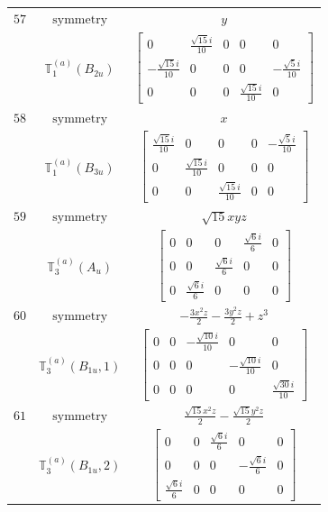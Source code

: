 \documentclass[fleqn,8pt,landscape]{jsarticle}
\begin{document}
\begin{longtable}{ccc}
$ 57 $ & $ \text{symmetry} $ & $ y $ \\
$  $ & $ \mathbb{T}_{1}^{(a)}(B_{2u}) $ & $ \begin{bmatrix} 0 & \frac{\sqrt{15} i}{10} & 0 & 0 & 0 \\ - \frac{\sqrt{15} i}{10} & 0 & 0 & 0 & - \frac{\sqrt{5} i}{10} \\ 0 & 0 & 0 & \frac{\sqrt{15} i}{10} & 0 \end{bmatrix} $ \\ \hline
$ 58 $ & $ \text{symmetry} $ & $ x $ \\
$  $ & $ \mathbb{T}_{1}^{(a)}(B_{3u}) $ & $ \begin{bmatrix} \frac{\sqrt{15} i}{10} & 0 & 0 & 0 & - \frac{\sqrt{5} i}{10} \\ 0 & \frac{\sqrt{15} i}{10} & 0 & 0 & 0 \\ 0 & 0 & \frac{\sqrt{15} i}{10} & 0 & 0 \end{bmatrix} $ \\ \hline
$ 59 $ & $ \text{symmetry} $ & $ \sqrt{15} x y z $ \\
$  $ & $ \mathbb{T}_{3}^{(a)}(A_{u}) $ & $ \begin{bmatrix} 0 & 0 & 0 & \frac{\sqrt{6} i}{6} & 0 \\ 0 & 0 & \frac{\sqrt{6} i}{6} & 0 & 0 \\ 0 & \frac{\sqrt{6} i}{6} & 0 & 0 & 0 \end{bmatrix} $ \\ \hline
$ 60 $ & $ \text{symmetry} $ & $ - \frac{3 x^{2} z}{2} - \frac{3 y^{2} z}{2} + z^{3} $ \\
$  $ & $ \mathbb{T}_{3}^{(a)}(B_{1u},1) $ & $ \begin{bmatrix} 0 & 0 & - \frac{\sqrt{10} i}{10} & 0 & 0 \\ 0 & 0 & 0 & - \frac{\sqrt{10} i}{10} & 0 \\ 0 & 0 & 0 & 0 & \frac{\sqrt{30} i}{10} \end{bmatrix} $ \\ \hline
$ 61 $ & $ \text{symmetry} $ & $ \frac{\sqrt{15} x^{2} z}{2} - \frac{\sqrt{15} y^{2} z}{2} $ \\
$  $ & $ \mathbb{T}_{3}^{(a)}(B_{1u},2) $ & $ \begin{bmatrix} 0 & 0 & \frac{\sqrt{6} i}{6} & 0 & 0 \\ 0 & 0 & 0 & - \frac{\sqrt{6} i}{6} & 0 \\ \frac{\sqrt{6} i}{6} & 0 & 0 & 0 & 0 \end{bmatrix} $ \\ \hline

\end{longtable}
\end{document}
